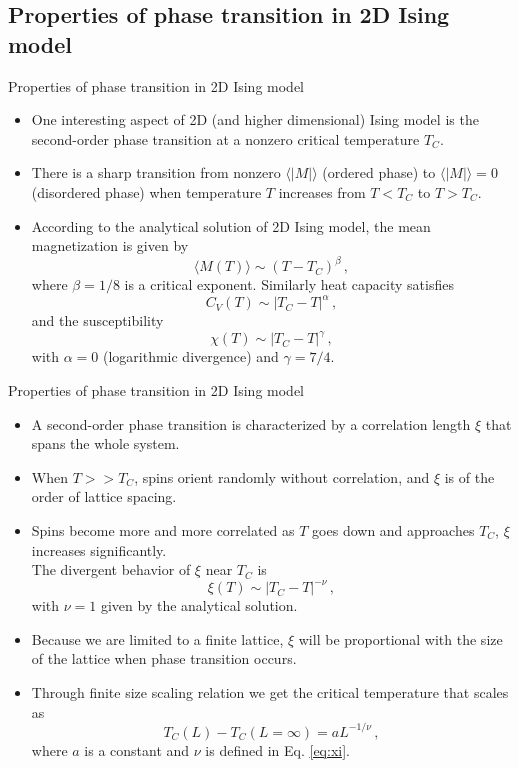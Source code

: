 \documentclass{beamer}
\begin{document}
\subsection{Properties of phase transition in 2D Ising model}
\begin{frame}{Properties of phase transition in 2D Ising model}
\begin{itemize}
	\item<1-> One interesting aspect of 2D (and higher dimensional) Ising model is the second-order phase transition 
	at a nonzero critical temperature $T_C$. 
	\item<2-> There is a sharp transition from nonzero $\langle|M|\rangle $ (ordered phase) to $\langle|M|\rangle=0$ (disordered phase)
	when temperature $T$ increases from $T<T_C$ to $T>T_C$. 
	\item<3-> According to the analytical solution of 2D Ising model, the mean magnetization is given by
	\begin{equation}
	\langle M(T) \rangle \sim \left(T-T_C\right)^{\beta}\,,
	\end{equation}
	where $\beta=1/8$ is a critical exponent. Similarly heat capacity satisfies 
	\begin{equation}
	C_V(T) \sim \left|T_C-T\right|^{\alpha}\,,
	\end{equation}
	and the susceptibility 
	\begin{equation}
	\chi(T) \sim \left|T_C-T\right|^{\gamma}\,,
	\end{equation}
	with $\alpha = 0$ (logarithmic divergence) and $\gamma = 7/4$. 
\end{itemize}
\end{frame}

\begin{frame}{Properties of phase transition in 2D Ising model}
\begin{itemize}
	\item<1-> A second-order phase transition is characterized by a
	correlation length $\xi$ that spans the whole system. 
	\item<2-> When $T>>T_C$, spins orient randomly without correlation, and $\xi$ is of the order of lattice spacing. 
	\item<3-> Spins	become more and more correlated as $T$ goes down and approaches $T_C$, 
	$\xi$ increases significantly. \\ The divergent
	behavior of $\xi$ near $T_C$ is 
	\begin{equation}
	\xi(T) \sim \left|T_C-T\right|^{-\nu}\,,
	\label{eq:xi}
	\end{equation}
	with $\nu=1$ given by the analytical solution. 
	\item<4-> Because we are limited to a finite lattice, $\xi$ will
	be proportional with the size of the lattice when phase transition occurs. 
	\item<5-> Through finite size scaling relation 
	we get the critical temperature that scales as
	\begin{equation}
	T_C(L)-T_C(L=\infty) = aL^{-1/\nu}\,,
	\end{equation}
	where $a$ is a constant and $\nu$ is defined in Eq. \ref{eq:xi}. 
\end{itemize}
\end{frame}
\end{document}
